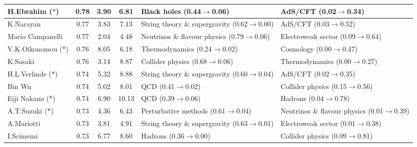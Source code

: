 \begin{table}[H]
\begin{tabular}{p{}|c|c|c|b{}|b{}}
     H.Ebrahim ($\ast$) &  0.78 &          3.90 &          6.81 &                   Black holes (0.44$\to$0.06) &                      AdS/CFT (0.02$\to$0.34)\\ \hline
              K.Narayan &  0.77 &          3.83 &          7.13 & String theory \& supergravity (0.62$\to$0.00) &                      AdS/CFT (0.03$\to$0.52)\\ \hline
       Mario Campanelli &  0.77 &          2.04 &          4.48 &  Neutrinos \& flavour physics (0.79$\to$0.06) &           Electroweak sector (0.09$\to$0.64)\\ \hline
 V.K.Oikonomou ($\ast$) &  0.76 &          8.05 &          6.18 &                Thermodynamics (0.24$\to$0.02) &                    Cosmology (0.00$\to$0.47)\\ \hline
               K.Sasaki &  0.76 &          3.14 &          8.87 &              Collider physics (0.68$\to$0.06) &               Thermodynamics (0.00$\to$0.27)\\ \hline
  H.L.Verlinde ($\ast$) &  0.74 &          5.32 &          8.88 & String theory \& supergravity (0.60$\to$0.04) &                      AdS/CFT (0.02$\to$0.35)\\ \hline
                 Bin Wu &  0.74 &          5.02 &          8.01 &                           QCD (0.41$\to$0.02) &             Collider physics (0.15$\to$0.56)\\ \hline
   Eiji Nakano ($\ast$) &  0.74 &          6.90 &         10.13 &                           QCD (0.39$\to$0.06) &                      Hadrons (0.04$\to$0.78)\\ \hline
    A.T.Suzuki ($\ast$) &  0.73 &          4.36 &          6.43 &          Perturbative methods (0.61$\to$0.04) & Neutrinos \& flavour physics (0.01$\to$0.39)\\ \hline
             A.Mariotti &  0.73 &          3.81 &          4.91 & String theory \& supergravity (0.63$\to$0.01) &           Electroweak sector (0.01$\to$0.38)\\ \hline
              I.Scimemi &  0.73 &          6.77 &          8.60 &                       Hadrons (0.36$\to$0.00) &             Collider physics (0.09$\to$0.81)\\ \hline
\bottomrule
\end{tabular}
\end{table}
